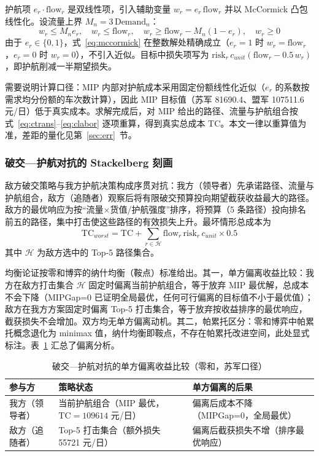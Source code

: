 \documentclass[12pt,a4paper]{ctexart}
\begin{document}
护航项 $e_r\cdot\mathrm{flow}_r$ 是双线性项，引入辅助变量 $w_r=e_r\,\mathrm{flow}_r$ 并以 McCormick 凸包线性化。设流量上界 $M_n=3\,\mathrm{Demand}_n$：
\begin{equation}
w_r\le M_n e_r,\quad w_r\le \mathrm{flow}_r,\quad w_r\ge \mathrm{flow}_r-M_n(1-e_r),\quad w_r\ge 0
\label{eq:mccormick}
\end{equation}
由于 $e_r\in\{0,1\}$，式~\eqref{eq:mccormick} 在整数解处精确成立（$e_r=1$ 时 $w_r=\mathrm{flow}_r$，$e_r=0$ 时 $w_r=0$），不引入近似。目标中损失项写为 $\mathrm{risk}_r\,c_{unit}(\mathrm{flow}_r-0.5\,w_r)$，即护航削减一半期望损失。

需要说明计算口径：MIP 内部对护航成本采用固定份额线性化近似（$e_r$ 的系数按需求均分份额的车次数计算），因此 MIP 目标值（苏军 81690.4、盟军 107511.6 元/日）低于真实成本。求解完成后，对 MIP 给出的路径、流量与护航组合按式~\eqref{eq:ctrans}--\eqref{eq:clabor} 逐项重算，得到真实总成本 TC。本文一律以重算值为准，差距的量化见第~\ref{sec:err}~节。

\subsubsection{破交—护航对抗的 Stackelberg 刻画}

敌方破交策略与我方护航决策构成序贯对抗：我方（领导者）先承诺路径、流量与护航组合，敌方（追随者）观察后将有限破交预算投向期望截获收益最大的路径。敌方的最优响应为按“流量$\times$货值/护航强度”排序，将预算（5 条路径）投向排名前五的路径，集中打击使这些路径的有效损失上升。最坏情形总成本为
\begin{equation}
\mathrm{TC}_{worst}=\mathrm{TC}+\sum_{r\in\mathcal{H}}\mathrm{flow}_r\,\mathrm{risk}_r\,c_{unit}\times 0.5
\label{eq:worst}
\end{equation}
其中 $\mathcal{H}$ 为敌方选中的 Top-5 路径集合。

均衡论证按零和博弈的纳什均衡（鞍点）标准给出。其一，单方偏离收益比较：我方在敌方打击集合 $\mathcal{H}$ 固定时偏离当前护航组合，等于放弃 MIP 最优解，总成本不会下降（MIPGap=0 已证明全局最优，任何可行偏离的目标值不小于最优值）；敌方在我方方案固定时偏离 Top-5 打击集合，等于放弃按收益排序的最优响应，截获损失不会增加。双方均无单方偏离动机。其二，帕累托区分：零和博弈中帕累托概念退化为 minimax 值，纳什均衡即鞍点，不存在帕累托改进空间，此处显式标注。表~\ref{tab:game} 汇总了偏离分析。

\begin{table}[H]
\centering
\caption{破交—护航对抗的单方偏离收益比较（零和，苏军口径）}
\label{tab:game}
\begin{tabular}{p{2.2cm}p{5.8cm}p{5.2cm}}
\toprule
参与方 & 策略状态 & 单方偏离的后果 \\
\midrule
我方（领导者） & 当前护航组合（MIP 最优，$\mathrm{TC}=109614$ 元/日） & 偏离后成本不降（MIPGap=0，全局最优） \\
敌方（追随者） & Top-5 打击集合（额外损失 55721 元/日） & 偏离后截获损失不增（排序最优响应） \\
\bottomrule
\end{tabular}
\end{table}
\end{document}
